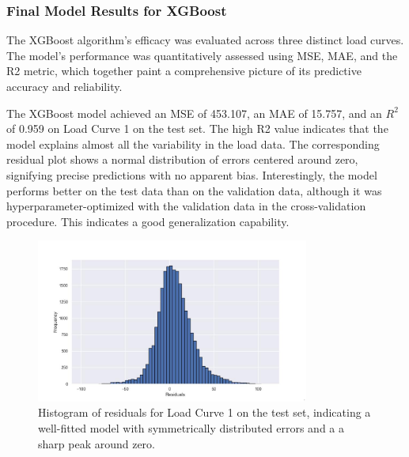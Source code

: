 \documentclass{article} %
\begin{document}
\subsubsection{Final Model Results for XGBoost}
The XGBoost algorithm's efficacy was evaluated across three distinct load curves. The model's performance was quantitatively assessed using \gls*{MSE}, \gls*{MAE}, and the \gls*{R2} metric, which together paint a comprehensive picture of its predictive accuracy and reliability.

The XGBoost model achieved an \gls*{MSE} of 453.107, an \gls*{MAE} of 15.757, and an $R^2$ of 0.959 on Load Curve 1 on the test set. The high \gls*{R2} value indicates that the model explains almost all the variability in the load data. The corresponding residual plot shows a normal distribution of errors centered around zero, signifying precise predictions with no apparent bias. Interestingly, the model performs better on the test data than on the validation data, although it was hyperparameter-optimized with the validation data in the cross-validation procedure. This indicates a good generalization capability.
\begin{figure}[H]
\centering
\includegraphics[width=0.8\textwidth]{ressources/residuals/erg/lc1/residuals.jpg}
\caption{Histogram of residuals for Load Curve 1 on the test set, indicating a well-fitted model with symmetrically distributed errors and a a sharp peak around zero.}
\label{fig:residuals_curve1}
\end{figure}
\end{document}
